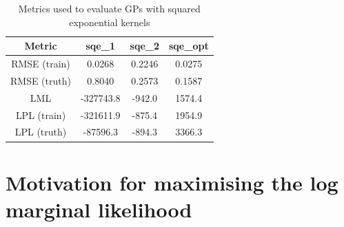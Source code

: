 \documentclass{article}
\begin{document}
\begin{table}[ht]
    \centering
    \begin{tabular}{|c|c|c|c|}
        \hline
        Metric & sqe\_1 & sqe\_2 & sqe\_opt \\
        \hline
        RMSE (train) & 0.0268 & 0.2246 & 0.0275 \\
        RMSE (truth) & 0.8040 & 0.2573 & 0.1587 \\
        LML & -327743.8 & -942.0 & 1574.4 \\
        LPL (train) & -321611.9 & -875.4 & 1954.9 \\
        LPL (truth) & -87596.3 & -894.3 & 3366.3 \\
        \hline
    \end{tabular}
    \caption{Metrics used to evaluate GPs with squared exponential kernels}
    \label{table:sqe_metrics_table}
\end{table}

\section{Motivation for maximising the log marginal likelihood}\label{appendix:why_lml}




\end{document}
